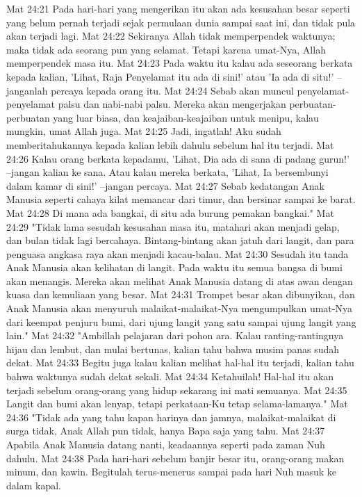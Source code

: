 Mat 24:21  Pada hari-hari yang mengerikan itu akan ada kesusahan besar seperti yang belum pernah terjadi sejak permulaan dunia sampai saat ini, dan tidak pula akan terjadi lagi.
Mat 24:22  Sekiranya Allah tidak memperpendek waktunya; maka tidak ada seorang pun yang selamat. Tetapi karena umat-Nya, Allah memperpendek masa itu.
Mat 24:23  Pada waktu itu kalau ada seseorang berkata kepada kalian, 'Lihat, Raja Penyelamat itu ada di sini!' atau 'Ia ada di situ!' --janganlah percaya kepada orang itu.
Mat 24:24  Sebab akan muncul penyelamat-penyelamat palsu dan nabi-nabi palsu. Mereka akan mengerjakan perbuatan-perbuatan yang luar biasa, dan keajaiban-keajaiban untuk menipu, kalau mungkin, umat Allah juga.
Mat 24:25  Jadi, ingatlah! Aku sudah memberitahukannya kepada kalian lebih dahulu sebelum hal itu terjadi.
Mat 24:26  Kalau orang berkata kepadamu, 'Lihat, Dia ada di sana di padang gurun!' --jangan kalian ke sana. Atau kalau mereka berkata, 'Lihat, Ia bersembunyi dalam kamar di sini!' --jangan percaya.
Mat 24:27  Sebab kedatangan Anak Manusia seperti cahaya kilat memancar dari timur, dan bersinar sampai ke barat.
Mat 24:28  Di mana ada bangkai, di situ ada burung pemakan bangkai."
Mat 24:29  "Tidak lama sesudah kesusahan masa itu, matahari akan menjadi gelap, dan bulan tidak lagi bercahaya. Bintang-bintang akan jatuh dari langit, dan para penguasa angkasa raya akan menjadi kacau-balau.
Mat 24:30  Sesudah itu tanda Anak Manusia akan kelihatan di langit. Pada waktu itu semua bangsa di bumi akan menangis. Mereka akan melihat Anak Manusia datang di atas awan dengan kuasa dan kemuliaan yang besar.
Mat 24:31  Trompet besar akan dibunyikan, dan Anak Manusia akan menyuruh malaikat-malaikat-Nya mengumpulkan umat-Nya dari keempat penjuru bumi, dari ujung langit yang satu sampai ujung langit yang lain."
Mat 24:32  "Ambillah pelajaran dari pohon ara. Kalau ranting-rantingnya hijau dan lembut, dan mulai bertunas, kalian tahu bahwa musim panas sudah dekat.
Mat 24:33  Begitu juga kalau kalian melihat hal-hal itu terjadi, kalian tahu bahwa waktunya sudah dekat sekali.
Mat 24:34  Ketahuilah! Hal-hal itu akan terjadi sebelum orang-orang yang hidup sekarang ini mati semuanya.
Mat 24:35  Langit dan bumi akan lenyap, tetapi perkataan-Ku tetap selama-lamanya."
Mat 24:36  "Tidak ada yang tahu kapan harinya dan jamnya, malaikat-malaikat di surga tidak, Anak Allah pun tidak, hanya Bapa saja yang tahu.
Mat 24:37  Apabila Anak Manusia datang nanti, keadaannya seperti pada zaman Nuh dahulu.
Mat 24:38  Pada hari-hari sebelum banjir besar itu, orang-orang makan minum, dan kawin. Begitulah terus-menerus sampai pada hari Nuh masuk ke dalam kapal.
